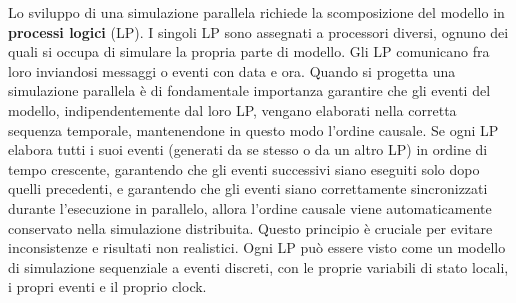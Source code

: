 \documentclass[12pt,a4paper,openright,twoside]{book}
\begin{document}
Lo sviluppo di una simulazione parallela richiede la scomposizione del modello in \textbf{processi logici} (LP). I singoli LP sono assegnati a processori diversi, ognuno dei quali si occupa di simulare la propria parte di modello. Gli LP comunicano fra loro inviandosi messaggi o eventi con data e ora.
Quando si progetta una simulazione parallela è di fondamentale importanza garantire che gli eventi del modello, indipendentemente dal loro LP, vengano elaborati nella corretta sequenza temporale, mantenendone in questo modo l'ordine causale. Se ogni LP elabora tutti i suoi eventi (generati da se stesso o da un altro LP) in ordine di tempo crescente, garantendo che gli eventi successivi siano eseguiti solo dopo quelli precedenti, e garantendo che gli eventi siano correttamente sincronizzati durante l'esecuzione in parallelo, allora l'ordine causale viene automaticamente conservato nella simulazione distribuita. Questo principio è cruciale per evitare inconsistenze e risultati non realistici.
Ogni LP può essere visto come un modello di simulazione sequenziale a eventi discreti, con le proprie variabili di stato locali, i propri eventi e il proprio clock.
\end{document}
